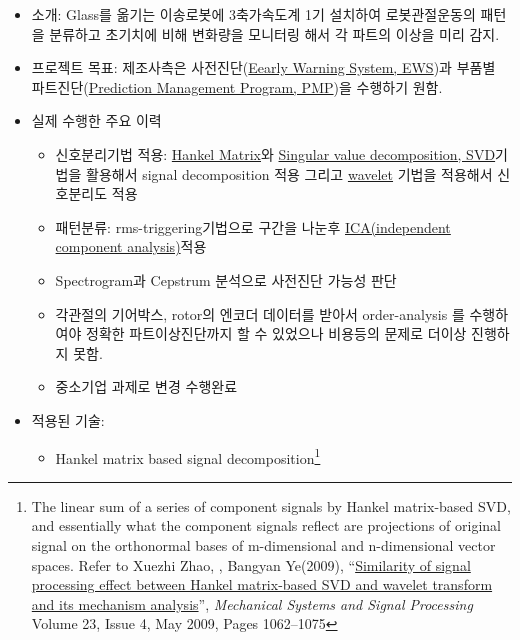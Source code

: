 \documentclass[10pt,a4paper,ragged2e]{altacv}
\begin{document}
\begin{fullwidth}
\divider


\begin{itemize}
\item 소개: Glass를 옮기는 이송로봇에 3축가속도계 1기 설치하여 로봇관절운동의 패턴을 분류하고 초기치에 비해 변화량을 모니터링 해서 각 파트의 이상을 미리 감지. 
\item 프로젝트 목표: 제조사측은 사전진단(\href{https://en.wikipedia.org/wiki/Early_warning_system}{Eearly Warning System, EWS})과 부품별 파트진단(\href{https://en.wikipedia.org/wiki/Predictive_maintenance}{Prediction Management Program, PMP})을 수행하기 원함.
\item 실제 수행한 주요 이력
  \begin{itemize}
    \item 신호분리기법 적용: \href{https://en.wikipedia.org/wiki/Hankel_matrix}{Hankel Matrix}와 \href{https://en.wikipedia.org/wiki/Singular_value_decomposition}{Singular value decomposition, SVD}기법을 활용해서 signal decomposition 적용 그리고 \href{https://en.wikipedia.org/wiki/Wavelet}{wavelet} 기법을 적용해서 신호분리도 적용 \item 패턴분류: rms-triggering기법으로 구간을 나눈후 \href{https://en.wikipedia.org/wiki/Independent_component_analysis}{ICA(independent component analysis)}적용
    \item Spectrogram과 Cepstrum 분석으로 사전진단 가능성 판단
    \item 각관절의 기어박스, rotor의 엔코더 데이터를 받아서 order-analysis 를 수행하여야 정확한 파트이상진단까지 할 수 있었으나 비용등의 문제로 더이상 진행하지 못함. 
    \item 중소기업 과제로 변경 수행완료
  \end{itemize}
\item 적용된 기술:
  \begin{itemize}
    \item Hankel matrix based signal decomposition\footnote{The linear sum of a series of component signals by Hankel matrix-based SVD, and essentially what the component signals reflect are projections of original signal on the orthonormal bases of m-dimensional and n-dimensional vector spaces. Refer to Xuezhi Zhao, , Bangyan Ye(2009),  ``\href{http://www.sciencedirect.com/science/article/pii/S0888327008002604}{Similarity of signal processing effect between Hankel matrix-based SVD and wavelet transform and its mechanism analysis}'', \emph{Mechanical Systems and Signal Processing} Volume 23, Issue 4, May 2009, Pages 1062--1075}

\end{itemize}
\end{itemize}
\end{fullwidth}
\end{document}
